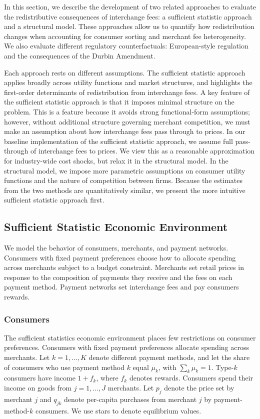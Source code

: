 \documentclass[11pt,english]{article}
\theoremstyle{remark}
\begin{document}
In this section, we describe the development of two related approaches to evaluate the redistributive consequences of interchange fees: a sufficient statistic approach and a structural model.
These approaches allow us to quantify how redistribution changes when accounting for consumer sorting and merchant fee heterogeneity.
We also evaluate different regulatory counterfactuals: European-style regulation and the consequences of the Durbin Amendment.

Each approach rests on different assumptions. The sufficient statistic approach applies broadly across utility functions and market structures, and highlights the first-order determinants of redistribution from interchange fees. A key feature of the sufficient statistic approach is that it imposes minimal structure on the problem. This is a feature because it avoids strong functional-form assumptions; however, without additional structure governing merchant competition, we must make an assumption about how interchange fees pass through to prices. In our baseline implementation of the sufficient statistic approach, we assume full pass-through of interchange fees to prices. We view this as a reasonable approximation for industry-wide cost shocks, but relax it in the structural model. In the structural model, we impose more parametric assumptions on consumer utility functions and the nature of competition between firms. Because the estimates from the two methods are quantitatively similar, we present the more intuitive sufficient statistic approach first.





\subsection{Sufficient Statistic Economic Environment}

We model the behavior of consumers, merchants, and payment networks.
Consumers with fixed payment preferences choose how to allocate spending across merchants subject to a budget constraint.
Merchants set retail prices in response to the composition of payments they receive and the fees on each payment method.
Payment networks set interchange fees and pay consumers rewards.

\subsubsection{Consumers}
The sufficient statistics economic environment places few restrictions on consumer preferences.
Consumers with fixed payment preferences allocate spending across merchants.
Let $k=1,\ldots,K$ denote different payment methods, and let the share of consumers who use payment method $k$ equal $\mu_k$, with $\sum_k \mu_k=1$.
Type-$k$ consumers have income $1 + f_k$, where $f_k$ denotes rewards.
Consumers spend their income on goods from $j=1,\ldots,J$ merchants.
Let $p_j$ denote the price set by merchant $j$ and $q_{jk}$ denote per-capita purchases from merchant $j$ by payment-method-$k$ consumers.
We use stars to denote equilibrium values.
\end{document}
